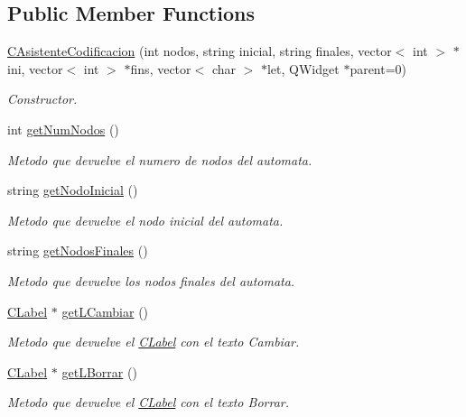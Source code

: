 \subsection*{Public Member Functions}
\begin{DoxyCompactItemize}
\item 
\hyperlink{classCAsistenteCodificacion_a8648c998d92db260247f676e29a02a40}{C\+Asistente\+Codificacion} (int nodos, string inicial, string finales, vector$<$ int $>$ $\ast$ini, vector$<$ int $>$ $\ast$fins, vector$<$ char $>$ $\ast$let, Q\+Widget $\ast$parent=0)
\begin{DoxyCompactList}\small\item\em Constructor. \end{DoxyCompactList}\item 
int \hyperlink{classCAsistenteCodificacion_ac65429657b7d034bb8b422ed61b5841c}{get\+Num\+Nodos} ()
\begin{DoxyCompactList}\small\item\em Metodo que devuelve el numero de nodos del automata. \end{DoxyCompactList}\item 
string \hyperlink{classCAsistenteCodificacion_a249f33a94fb1ec310f61ed79e756a630}{get\+Nodo\+Inicial} ()
\begin{DoxyCompactList}\small\item\em Metodo que devuelve el nodo inicial del automata. \end{DoxyCompactList}\item 
string \hyperlink{classCAsistenteCodificacion_a73fc973e9134649fa288b499a0723192}{get\+Nodos\+Finales} ()
\begin{DoxyCompactList}\small\item\em Metodo que devuelve los nodos finales del automata. \end{DoxyCompactList}\item 
\hyperlink{classCLabel}{C\+Label} $\ast$ \hyperlink{classCAsistenteCodificacion_a3b17ecf32b2b4b5e8d3900cdeaa780ff}{get\+L\+Cambiar} ()
\begin{DoxyCompactList}\small\item\em Metodo que devuelve el \hyperlink{classCLabel}{C\+Label} con el texto \textquotesingle{}Cambiar\textquotesingle{}. \end{DoxyCompactList}\item 
\hyperlink{classCLabel}{C\+Label} $\ast$ \hyperlink{classCAsistenteCodificacion_acee142b78f7055424fb48d6df9dcee98}{get\+L\+Borrar} ()
\begin{DoxyCompactList}\small\item\em Metodo que devuelve el \hyperlink{classCLabel}{C\+Label} con el texto \textquotesingle{}Borrar\textquotesingle{}. \end{DoxyCompactList}\item 

\end{DoxyCompactItemize}
